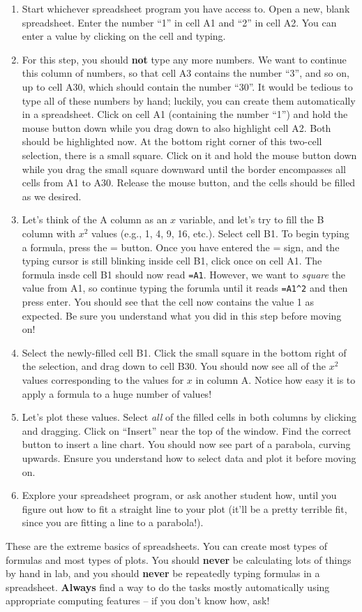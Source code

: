 \documentclass[10pt]{article}
\begin{document}
\begin{enumerate}
\item Start whichever spreadsheet program you have access to. Open a new, blank spreadsheet. Enter the number ``1'' in cell A1 and ``2'' in cell A2. You can enter a value by clicking on the cell and typing.
\item For this step, you should \textbf{not} type any more numbers. We want to continue this column of numbers, so that cell A3 contains the number ``3'', and so on, up to cell A30, which should contain the number ``30''. It would be tedious to type all of these numbers by hand; luckily, you can create them automatically in a spreadsheet. Click on cell A1 (containing the number ``1'') and hold the mouse button down while you drag down to also highlight cell A2. Both should be highlighted now. At the bottom right corner of this two-cell selection, there is a small square. Click on it and hold the mouse button down while you drag the small square downward until the border encompasses all cells from A1 to A30. Release the mouse button, and the cells should be filled as we desired.
\item Let's think of the A column as an $x$ variable, and let's try to fill the B column with $x^2$ values (e.g., 1, 4, 9, 16, etc.). Select cell B1. To begin typing a formula, press the = button. Once you have entered the = sign, and the typing cursor is still blinking inside cell B1, click once on cell A1. The formula insde cell B1 should now read \texttt{=A1}. However, we want to \textit{square} the value from A1, so continue typing the forumla until it reads \texttt{=A1\textasciicircum2} and then press enter. You should see that the cell now contains the value 1 as expected. Be sure you understand what you did in this step before moving on!
\item Select the newly-filled cell B1. Click the small square in the bottom right of the selection, and drag down to cell B30. You should now see all of the $x^2$ values corresponding to the values for $x$ in column A. Notice how easy it is to apply a formula to a huge number of values!
\item Let's plot these values. Select \textit{all} of the filled cells in both columns by clicking and dragging. Click on ``Insert'' near the top of the window. Find the correct button to insert a line chart. You should now see part of a parabola, curving upwards. Ensure you understand how to select data and plot it before moving on.
\item Explore your spreadsheet program, or ask another student how, until you figure out how to fit a straight line to your plot (it'll be a pretty terrible fit, since you are fitting a line to a parabola!).
\end{enumerate}
These are the extreme basics of spreadsheets. You can create most types of formulas and most types of plots. You should \textbf{never} be calculating lots of things by hand in lab, and you should \textbf{never} be repeatedly typing formulas in a spreadsheet. \textbf{Always} find a way to do the tasks mostly automatically using appropriate computing features -- if you don't know how, ask!
\end{document}
